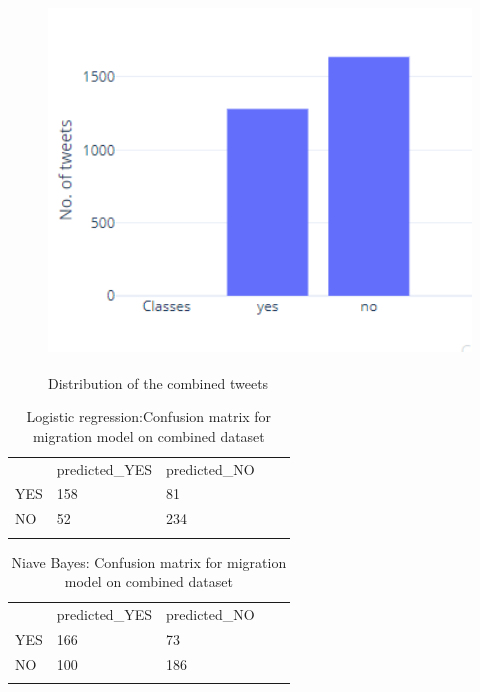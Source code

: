 \begin{figure}
	\centering
	\includegraphics[width=10cm\linewidth,height=10cm]{thesis_template/images/combined.png}
	\caption{Distribution of the combined tweets}
	\label{fig:combined}
\end{figure}




\begin{table}[]
\centering
\begin{tabular}{lllll}
\cline{1-3}
\multicolumn{1}{|l|}{}   & \multicolumn{1}{l|}{predicted\_YES} & \multicolumn{1}{l|}{predicted\_NO}  &  &  \\ \cline{1-3}
\multicolumn{1}{|l|}{YES} & \multicolumn{1}{l|}{158}  & \multicolumn{1}{l|}{81} &  &  \\ \cline{1-3}
\multicolumn{1}{|l|}{NO}   & \multicolumn{1}{l|}{52}  & \multicolumn{1}{l|}{234}  &  &  \\ \cline{1-3}
                            &                           &                           &  & 
\end{tabular}
\caption{Logistic regression:Confusion matrix for migration model on combined dataset}
\label{tab:confusionmatrix_migrationtweets_com_LR}
\end{table}

\begin{table}[]
\centering
\begin{tabular}{lllll}
\cline{1-3}
\multicolumn{1}{|l|}{}   & \multicolumn{1}{l|}{predicted\_YES} & \multicolumn{1}{l|}{predicted\_NO}  &  &  \\ \cline{1-3}
\multicolumn{1}{|l|}{YES} & \multicolumn{1}{l|}{166}  & \multicolumn{1}{l|}{73} &  &  \\ \cline{1-3}
\multicolumn{1}{|l|}{NO}   & \multicolumn{1}{l|}{100}  & \multicolumn{1}{l|}{186}  &  &  \\ \cline{1-3}
                            &                           &                           &  & 
\end{tabular}
\caption{Niave Bayes: Confusion matrix for migration model on combined dataset}
\label{tab:confusionmatrix_migrationtweets_com_NB}
\end{table}


